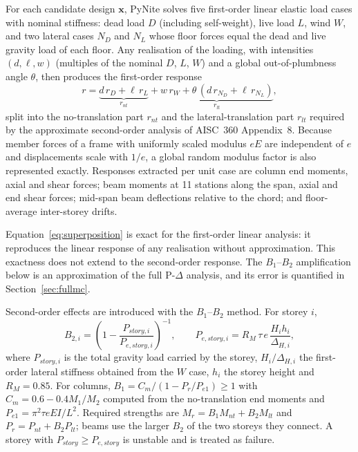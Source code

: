 For each candidate design $\mathbf{x}$, PyNite \citep{PyNite} solves five first-order linear
elastic load cases with nominal stiffness: dead load $D$ (including self-weight), live load
$L$, wind $W$, and two lateral cases $N_D$ and $N_L$ whose floor forces equal the dead and live
gravity load of each floor. Any realisation of the loading, with intensities
$(d,\ell,w)$ (multiples of the nominal $D$, $L$, $W$) and a global out-of-plumbness angle
$\theta$, then produces the first-order response
\begin{equation}
r = \underbrace{d\,r_D + \ell\,r_L}_{r_{nt}}
  + \underbrace{w\,r_W + \theta\,(d\,r_{N_D} + \ell\,r_{N_L})}_{r_{lt}},
\label{eq:superposition}
\end{equation}
split into the no-translation part $r_{nt}$ and the lateral-translation part $r_{lt}$
required by the approximate second-order analysis of AISC~360 Appendix~8. Because member
forces of a frame with uniformly scaled modulus $eE$ are independent of $e$ and displacements
scale with $1/e$, a global random modulus factor is also represented exactly. Responses
extracted per unit case are column end moments, axial and shear forces; beam moments at 11
stations along the span, axial and end shear forces; mid-span beam deflections relative to the
chord; and floor-average inter-storey drifts.

Equation~\eqref{eq:superposition} is exact for the first-order linear analysis: it reproduces the
linear response of any realisation without approximation. This exactness does not extend to the
second-order response. The $B_1$--$B_2$ amplification below is an approximation of the full
P-$\Delta$ analysis, and its error is quantified in Section~\ref{sec:fullmc}.

Second-order effects are introduced with the $B_1$--$B_2$ method. For storey $i$,
\begin{equation}
B_{2,i} = \left(1-\frac{P_{story,i}}{P_{e,story,i}}\right)^{-1},\qquad
P_{e,story,i} = R_M \,\tau\, e\,\frac{H_i h_i}{\Delta_{H,i}},
\label{eq:B2}
\end{equation}
where $P_{story,i}$ is the total gravity load carried by the storey, $H_i/\Delta_{H,i}$ the
first-order lateral stiffness obtained from the $W$ case, $h_i$ the storey height and
$R_M=0.85$. For columns, $B_1 = C_m/(1-P_r/P_{e1})\ge1$ with $C_m = 0.6-0.4M_1/M_2$
computed from the no-translation end moments and $P_{e1} = \pi^2\tau eEI/L^2$. Required
strengths are $M_r = B_1M_{nt} + B_2M_{lt}$ and $P_r = P_{nt}+B_2P_{lt}$; beams use the
larger $B_2$ of the two storeys they connect. A storey with $P_{story}\ge P_{e,story}$ is
unstable and is treated as failure.

